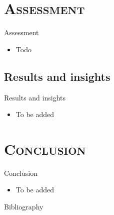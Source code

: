 \documentclass[xcolor=x11names,compress]{beamer}
\renewcommand{\(}{\begin{columns}}
\renewcommand{\)}{\end{columns}}
\newcommand{\<}[1]{\begin{column}{#1}}
\renewcommand{\>}{\end{column}}
\begin{document}
\section{\scshape Assessment}
\begin{frame}{Assessment}
\begin{itemize}
  \item  Todo
\end{itemize}
\end{frame}

\subsection{Results and insights}
\begin{frame}{Results and insights}
\begin{itemize}
\item To be added
\end{itemize}
\end{frame}


\section{\scshape Conclusion}
\begin{frame}{Conclusion}
\begin{itemize}
\item To be added
\end{itemize}
\end{frame}

\begin{frame}{Bibliography}


\end{frame}
%
\end{document}
